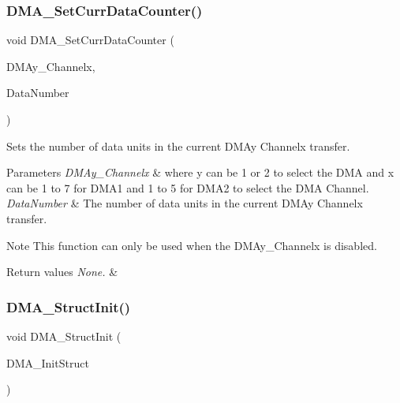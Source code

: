 \subsubsection{\texorpdfstring{DMA\_SetCurrDataCounter()}{DMA\_SetCurrDataCounter()}}
{\footnotesize\ttfamily void D\+M\+A\+\_\+\+Set\+Curr\+Data\+Counter (\begin{DoxyParamCaption}\item[{\mbox{\hyperlink{struct_d_m_a___channel___type_def}{D\+M\+A\+\_\+\+Channel\+\_\+\+Type\+Def}} $\ast$}]{D\+M\+Ay\+\_\+\+Channelx,  }\item[{uint16\+\_\+t}]{Data\+Number }\end{DoxyParamCaption})}



Sets the number of data units in the current D\+M\+Ay Channelx transfer. 


\begin{DoxyParams}{Parameters}
{\em D\+M\+Ay\+\_\+\+Channelx} & where y can be 1 or 2 to select the D\+MA and x can be 1 to 7 for D\+M\+A1 and 1 to 5 for D\+M\+A2 to select the D\+MA Channel. \\
\hline
{\em Data\+Number} & The number of data units in the current D\+M\+Ay Channelx transfer.\\
\hline
\end{DoxyParams}
\begin{DoxyNote}{Note}
This function can only be used when the D\+M\+Ay\+\_\+\+Channelx is disabled.
\end{DoxyNote}

\begin{DoxyRetVals}{Return values}
{\em None.} & \\
\hline
\end{DoxyRetVals}
\mbox{\label{group___d_m_a___private___functions_ga0f7f95f750a90a6824f4e9b6f58adc7e}} 
\subsubsection{\texorpdfstring{DMA\_StructInit()}{DMA\_StructInit()}}
{\footnotesize\ttfamily void D\+M\+A\+\_\+\+Struct\+Init (\begin{DoxyParamCaption}\item[{\mbox{\hyperlink{struct_d_m_a___init_type_def}{D\+M\+A\+\_\+\+Init\+Type\+Def}} $\ast$}]{D\+M\+A\+\_\+\+Init\+Struct }\end{DoxyParamCaption})}



